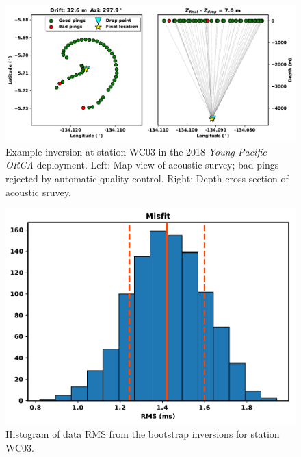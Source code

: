 \documentclass[titlepage, 12pt]{article}
\begin{document}
  \begin{figure}[!htb]
   \centering
   \includegraphics[width=0.9\linewidth]{maps.pdf}
   \caption{Example inversion at station WC03 in the 2018 \textit{Young Pacific ORCA} deployment. Left: Map view of acoustic survey; bad pings rejected by automatic quality control. Right: Depth cross-section of acoustic sruvey.}
  \end{figure}
 
  \begin{figure}[!htb]
   \centering
   \includegraphics[width=0.7\linewidth]{misfit.pdf}
   \caption{Histogram of data RMS from the bootstrap inversions for station WC03.}
  \end{figure}
\end{document}
